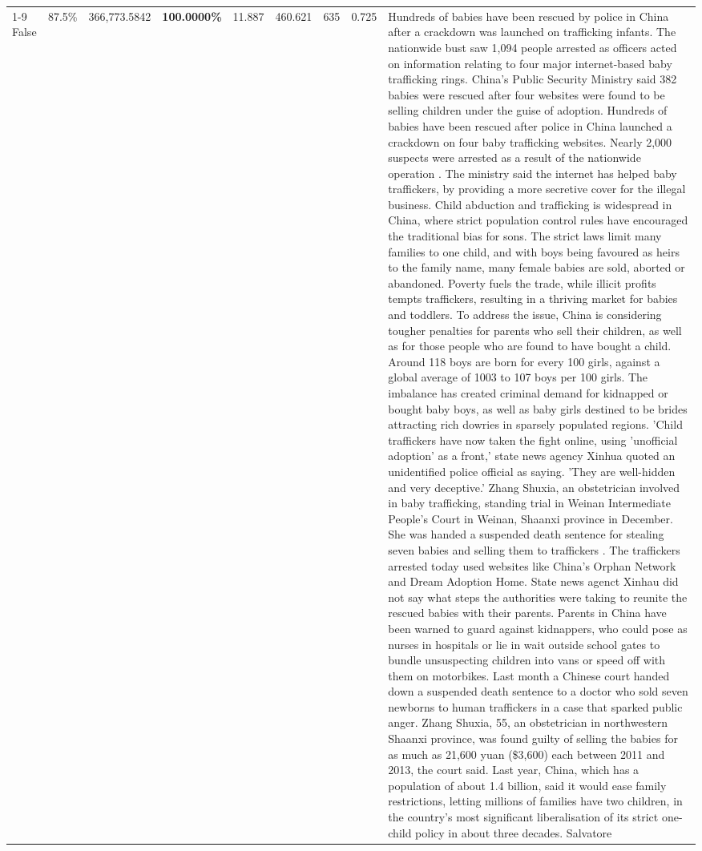 \begin{table}[H]
\begin{tabular}{lllrlllll}
\cline{1-9}
False & 87.5\% & 366,773.5842 & \bfseries \color{red} 100.0000\% & 11.887 & 460.621 & 635 & 0.725 & Hundreds of babies have been rescued by police in China after a crackdown was launched on trafficking infants. The nationwide bust saw 1,094 people arrested as officers acted on information relating to four major internet-based baby trafficking rings. China's Public Security Ministry said 382 babies were rescued after four websites were found to be selling children under the guise of adoption. Hundreds of babies have been rescued after police in China launched a crackdown on four baby trafficking websites. Nearly 2,000 suspects were arrested as a result of the nationwide operation . The ministry said the internet has helped baby traffickers, by providing a more secretive cover for the illegal business. Child abduction and trafficking is widespread in China, where strict population control rules have encouraged the traditional bias for sons. The strict laws limit many families to one child, and with boys being favoured as heirs to the family name, many female babies are sold, aborted or abandoned. Poverty fuels the trade, while illicit profits tempts traffickers, resulting in a thriving market for babies and toddlers. To address the issue, China is considering tougher penalties for parents who sell their children, as well as for those people who are found to have bought a child. Around 118 boys are born for every 100 girls, against a global average of 1003 to 107 boys per 100 girls. The imbalance has created criminal demand for kidnapped or bought baby boys, as well as baby girls destined to be brides attracting rich dowries in sparsely populated regions. 'Child traffickers have now taken the fight online, using 'unofficial adoption' as a front,' state news agency Xinhua quoted an unidentified police official as saying. 'They are well-hidden and very deceptive.' Zhang Shuxia, an obstetrician involved in baby trafficking, standing trial in Weinan Intermediate People's Court in Weinan, Shaanxi province in December. She was handed a suspended death sentence for stealing seven babies and selling them to traffickers . The traffickers arrested today used websites like China's Orphan Network and Dream Adoption Home. State news agenct Xinhau did not say what steps the authorities were taking to reunite the rescued babies with their parents. Parents in China have been warned to guard against kidnappers, who could pose as nurses in hospitals or lie in wait outside school gates to bundle unsuspecting children into vans or speed off with them on motorbikes. Last month a Chinese court handed down a suspended death sentence to a doctor who sold seven newborns to human traffickers in a case that sparked public anger. Zhang Shuxia, 55, an obstetrician in northwestern Shaanxi province, was found guilty of selling the babies for as much as 21,600 yuan (\$3,600) each between 2011 and 2013, the court said. Last year, China, which has a population of about 1.4 billion, said it would ease family restrictions, letting millions of families have two children, in the country's most significant liberalisation of its strict one-child policy in about three decades. Salvatore \\

\end{tabular}
\end{table}
